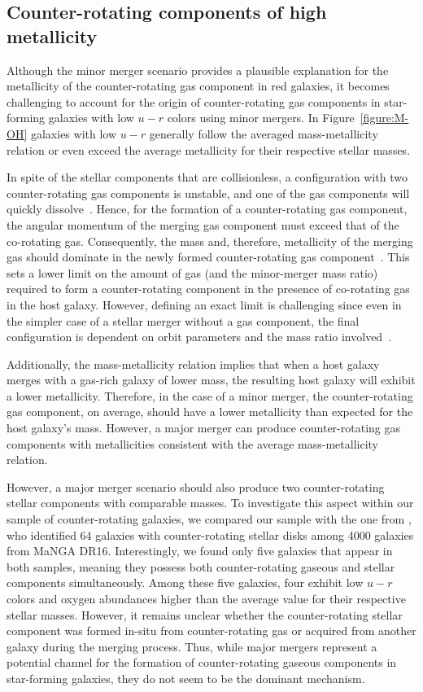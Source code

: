 \documentclass[12pt,preprint]{aa}
\begin{document}
\subsection{Counter-rotating components of high metallicity}

Although the minor merger scenario provides a plausible explanation for the metallicity of the counter-rotating gas component in red galaxies, it becomes challenging to account for the origin of counter-rotating gas components in star-forming galaxies with low $u-r$ colors using minor mergers. In Figure~\ref{figure:M-OH} galaxies with low $u-r$ generally follow the averaged mass-metallicity relation or even exceed the average metallicity for their respective stellar masses.

In spite of the stellar components that are collisionless, a configuration with two counter-rotating gas components is unstable, and one of the gas components will quickly dissolve~\citep[see, e.g.,][]{Khoperskov2021}. Hence, for the formation of a counter-rotating gas component, the angular momentum of the merging gas component must exceed that of the co-rotating gas. Consequently, the mass and, therefore, metallicity of the merging gas should dominate in the newly formed counter-rotating gas component~\citep{Bassett2017}. This sets a lower limit on the amount of gas (and the minor-merger mass ratio) required to form a counter-rotating component in the presence of co-rotating gas in the host galaxy. However, defining an exact limit is challenging since even in the simpler case of a stellar merger without a gas component, the final configuration is dependent on orbit parameters and the mass ratio involved~\citep{Zinchenko2015}.

Additionally, the mass-metallicity relation implies that when a host galaxy merges with a gas-rich galaxy of lower mass, the resulting host galaxy will exhibit a lower metallicity. Therefore, in the case of a minor merger, the counter-rotating gas component, on average, should have a lower metallicity than expected for the host galaxy's mass. However, a major merger can produce counter-rotating gas components with metallicities consistent with the average mass-metallicity relation.

However, a major merger scenario should also produce two counter-rotating stellar components with comparable masses. To investigate this aspect within our sample of counter-rotating galaxies, we compared our sample with the one from \citet{Bevacqua2022}, who identified 64 galaxies with counter-rotating stellar disks among 4000 galaxies from MaNGA DR16. Interestingly, we found only five galaxies that appear in both samples, meaning they possess both counter-rotating gaseous and stellar components simultaneously.
Among these five galaxies, four exhibit low $u-r$ colors and oxygen abundances higher than the average value for their respective stellar masses. However, it remains unclear whether the counter-rotating stellar component was formed in-situ from counter-rotating gas or acquired from another galaxy during the merging process. Thus, while major mergers represent a potential channel for the formation of counter-rotating gaseous components in star-forming galaxies, they do not seem to be the dominant mechanism.
\end{document}
